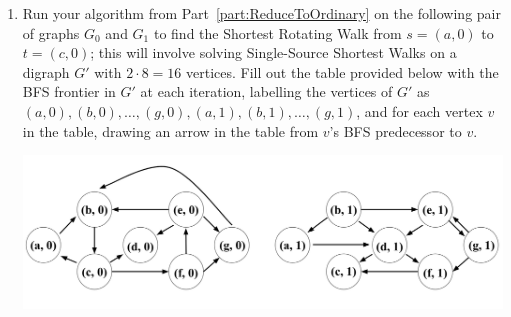 \documentclass[11pt]{article}
\begin{document}
\begin{enumerate}
\begin{enumerate}
        \item \label{part:BFS} Run your algorithm from Part~\ref{part:ReduceToOrdinary} on the following pair of graphs $G_0$ and $G_1$ to find the Shortest Rotating Walk from $s=(a,0)$ to $t=(c,0)$; this will involve solving Single-Source Shortest Walks on a digraph $G'$ with $2\cdot 8=16$ vertices. Fill out the table provided below with the BFS frontier in $G'$ at each iteration, labelling the vertices of $G'$ as $(a, 0),(b, 0),\ldots,(g,0),(a,1),(b,1),\ldots,(g,1)$, and for each vertex $v$ in the table, drawing an arrow in the table from $v$'s BFS predecessor to $v$. 

            \includegraphics[width=14cm]{ps4_graphs_new.png}


\end{enumerate}
\end{enumerate}
\end{document}
